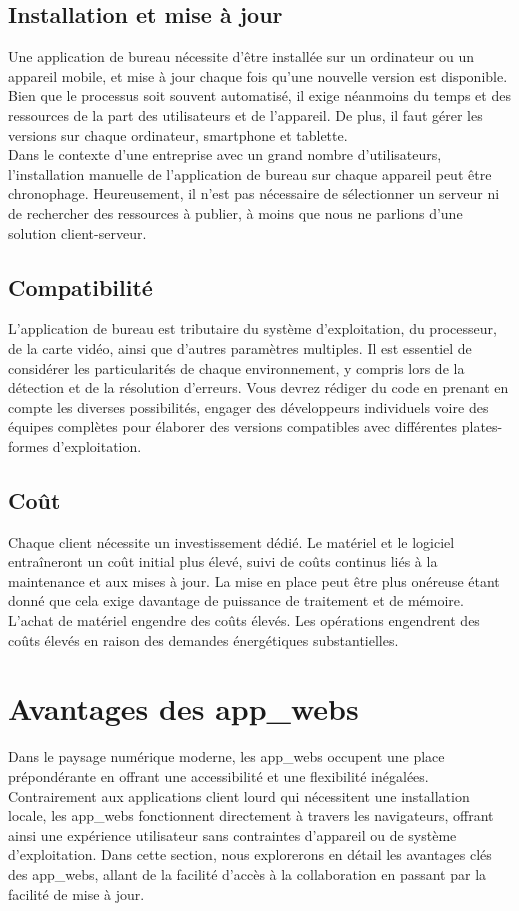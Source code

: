 \documentclass[a4paper, 12pt, french]{article}
\begin{document}
			\subsection{Installation et mise à jour}
				Une application de bureau nécessite d'être installée sur un ordinateur ou un appareil mobile, et mise à jour chaque fois qu'une nouvelle version est disponible. Bien que le processus soit souvent automatisé, il exige néanmoins du temps et des ressources de la part des utilisateurs et de l'appareil. De plus, il faut gérer les versions sur chaque ordinateur, smartphone et tablette.\\

				Dans le contexte d'une entreprise avec un grand nombre d'utilisateurs, l'installation manuelle de l'application de bureau sur chaque appareil peut être chronophage. Heureusement, il n'est pas nécessaire de sélectionner un serveur ni de rechercher des ressources à publier, à moins que nous ne parlions d'une solution client-serveur.

			\subsection{Compatibilité}
				L'application de bureau est tributaire du système d'exploitation, du processeur, de la carte vidéo, ainsi que d'autres paramètres multiples. Il est essentiel de considérer les particularités de chaque environnement, y compris lors de la détection et de la résolution d'erreurs. Vous devrez rédiger du code en prenant en compte les diverses possibilités, engager des développeurs individuels voire des équipes complètes pour élaborer des versions compatibles avec différentes plates-formes d'exploitation.
				
			\subsection{Coût}
				Chaque client nécessite un investissement dédié. Le matériel et le logiciel entraîneront un coût initial plus élevé, suivi de coûts continus liés à la maintenance et aux mises à jour. La mise en place peut être plus onéreuse étant donné que cela exige davantage de puissance de traitement et de mémoire. L'achat de matériel engendre des coûts élevés. Les opérations engendrent des coûts élevés en raison des demandes énergétiques substantielles.
			
		\section{Avantages des \glspl{app_web}}
			Dans le paysage numérique moderne, les \glspl{app_web} occupent une place prépondérante en offrant une accessibilité et une flexibilité inégalées. Contrairement aux applications client lourd qui nécessitent une installation locale, les \glspl{app_web} fonctionnent directement à travers les navigateurs, offrant ainsi une expérience utilisateur sans contraintes d'appareil ou de système d'exploitation. Dans cette section, nous explorerons en détail les avantages clés des \glspl{app_web}, allant de la facilité d'accès à la collaboration en passant par la facilité de mise à jour.
		
\end{document}

